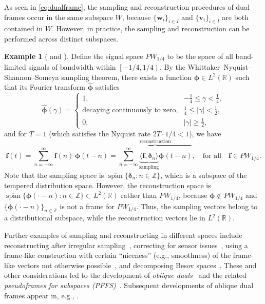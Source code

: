\documentclass{amsart}
\numberwithin{equation}{section}
\newcommand{\bof}{{\mathbf f}}
\newcommand{\bdel}{{\boldsymbol{\delta}}}
\newcommand{\bphi}{{\boldsymbol{\phi}}}
\theoremstyle{plain}
\theoremstyle{remark}
\theoremstyle{definition}
\newtheorem{example}[theorem]{Example}
\begin{document}
As seen in \cref{eq:dualframe}, the sampling and reconstruction procedures of dual frames occur in the same subspace $W$, because $\{\mathbf{w}_i\}_{i \in I}$ and $\{\mathbf{v}_i\}_{i \in I}$ are both contained in $W$. However, in practice, the sampling and reconstruction can be performed across distinct subspaces.

\begin{example}[{\cite[Example 2.1]{li1998theory}} and {\cite[Example 1]{li2004pseudo}}]\label{example:paley}
Define the signal space $PW_{1/4}$ to be the space of all band-limited signals of bandwidth within $\left[-1/4, 1/4\right)$. 
By the Whittaker–Nyquist–Shannon–Someya sampling theorem, there exists a function 
$\bphi \in L^{2}(\mathbb{R})$ such that its Fourier transform $\hat{\bphi}$ satisfies
\[
\hat{\bphi}(\gamma) = 
\begin{cases}
1, & -\tfrac{1}{4} \leq \gamma < \tfrac{1}{4}, \\[6pt]
\text{decaying continuously to zero}, & \tfrac{1}{4} \leq |\gamma| < \tfrac{1}{2}, \\[6pt]
0, & |\gamma| \geq \tfrac{1}{2},
\end{cases}
\]
and for $T = 1$ (which satisfies the Nyquist rate $2T \cdot 1/4 < 1$), we have
\[
\bof(t) = \sum_{n=-\infty}^\infty \bof(n)\,\bphi(t-n) = \overbrace{\sum_{n=-\infty}^\infty \underbrace{ \langle \bof, \bdel_n \rangle}_{\text{sampling}} \bphi(t-n)}^{\text{reconstruction}}, \quad \textrm{for all} \quad \bof \in PW_{1/4}.
\]
Note that the sampling space is $\overline{\operatorname{span}}\{\bdel_n:n\in\mathbb{Z}\}$, which is a subspace of the tempered distribution space. However, the reconstruction space is $\overline{\operatorname{span}}\{\bphi(\cdot-n):n\in\mathbb{Z}\}\subset L^2(\mathbb{R})$ rather than $PW_{1/4}$, because   $\bphi \notin PW_{1/4}$ and $\{\bphi(\cdot-n)\}_{n \in \mathbb{Z}}$ is not a frame for $PW_{1/4}$. Thus, the sampling vectors belong to a distributional subspace, while the reconstruction vectors lie in $L^{2}(\mathbb{R})$. 
\end{example}
Further examples of sampling and reconstructing in different spaces include reconstructing after irregular sampling~\cite{aldroudi2002nonuniform,feichtinger1992iterative}, correcting for sensor issues~\cite{unser2002general}, 
using a frame-like construction with certain ``niceness'' (e.g., smoothness) of the frame-like vectors not otherwise possible~\cite{li1998theory,christensen2004oblique}, and decomposing Besov spaces~\cite{frazier1985decomp}. These and other considerations led to the development of \emph{oblique duals}~\cite{eldar2001nonredundant,eldar2003sampling,christensen2004oblique,eldar2005general, eldar2006characterization} and the related \emph{pseudoframes for subspaces (PFFS)}~\cite{li1998theory,li1998pseudo,li2004pseudo}. Subsequent developments of oblique dual frames appear in, e.g., \cite{heineken2018oblique, diaz2023approximate,li2024making,li2025approximate}.
\end{document}
